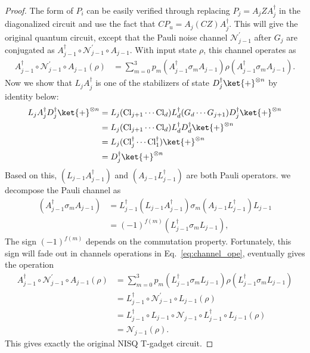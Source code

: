 \documentclass[aps,%
twocolumn,%
floatfix,%
pra,%
amsfonts,%
longbibliography,%
groupedaddress,%
superscriptaddress]{revtex4-2}%
\newcommand{\1}{\mathbbm{1}}
\begin{document}
\begin{proof}
   The form of $P_i$ can be easily verified through replacing $P_j = A_j Z A_j^\dagger$ in the diagonalized circuit and use the fact that $CP_u = A_j (CZ) A_j^\dagger$. This will give the original quantum circuit, except that the Pauli noise channel $\mathcal{N}_{j-1}^{'}$ after $G_j$ are conjugated as $A_{j-1}^\dagger\circ \mathcal{N}_{j-1}^{'}\circ A_{j-1} $. With input state $\rho$, this channel operates as
   \begin{align} \label{eq:channel_ope}
      A_{j-1}^\dagger \circ \mathcal{N}_{j-1}^{'}\circ A_{j-1}(\rho)&= \sum_{m = 0}^3 p_m (A_{j-1}^\dagger \sigma_{m} A_{j-1}) \rho (A_{j-1}^\dagger \sigma_{m} A_{j-1}).
   \end{align}
   Now we show that $L_j A_{j}^\dagger$ is one of the stabilizers of state $D_j^\dagger \ket{+}^{\otimes n}$ by identity below:
   \begin{align}
       L_j A_{j}^\dagger D_j^\dagger \ket{+}^{\otimes n} &=  L_j  (\text{Cl}_{j+1} \cdots\text{Cl}_d) L_d^\dagger (G_d \cdots G_{j+1}) D_j^\dagger \ket{+}^{\otimes n} \\
       &= L_j  (\text{Cl}_{j+1} \cdots\text{Cl}_d) L_d^\dagger D_d^\dagger \ket{+}^{\otimes n} \\
       &= L_j  (\text{Cl}_j^\dagger \cdots\text{Cl}_{1}^\dagger)  \ket{+}^{\otimes n} \\
       &= D_j^\dagger \ket{+}^{\otimes n}
   \end{align}
   Based on this, $(L_{j-1}A_{j-1}^\dagger)$ and $(A_{j-1}L_{j-1}^\dagger)$ are both Pauli operators. we decompose the Pauli channel as
   \begin{align}
       (A_{j-1}^\dagger \sigma_{m} A_{j-1}) &=L_{j-1}^\dagger (L_{j-1}A_{j-1}^\dagger)  \sigma_{m} (A_{j-1}L_{j-1}^\dagger) L_{j-1}\\
       &=(-1)^{f(m)}(L_{j-1}^\dagger \sigma_{m}L_{j-1}) ,
   \end{align}
The sign $(-1)^{f(m)}$ depends on the commutation property. Fortunately, this sign will fade out in channels operations in Eq.~\eqref{eq:channel_ope}, eventually gives the operation
\begin{align}
      A_{j-1}^\dagger\circ \mathcal{N}_{j-1}^{'}\circ A_{j-1}(\rho) &= \sum_{m = 0}^3 p_m (L_{j-1}^\dagger \sigma_{m}L_{j-1})  \rho (L_{j-1}^\dagger \sigma_{m}L_{j-1})\\
      &=L_{j-1}^\dagger\circ \mathcal{N}_{j-1}^{'}\circ L_{j-1}(\rho) \\
      &=L_{j-1}^\dagger\circ L_{j-1} \circ \mathcal{N}_{j-1}\circ L_{j-1}^\dagger \circ L_{j-1}(\rho) \\
      &= \mathcal{N}_{j-1}(\rho).
   \end{align}
   This gives exactly the original NISQ T-gadget circuit.
\end{proof}
\end{document}
